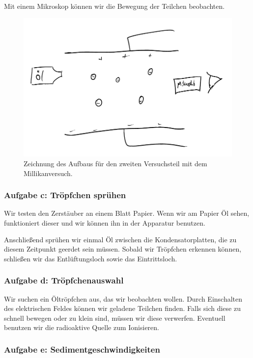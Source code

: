 \documentclass[11pt]{article}
\begin{document}
Mit einem Mikroskop können wir die Bewegung der Teilchen beobachten.

\begin{figure}[h!]
	\centering
	\includegraphics[width=\textwidth]{Aufbau_Millikanversuch.pdf}
	\caption{Zeichnung des Aufbaus für den zweiten Versuchsteil mit dem
	Millikanversuch.}
	\label{fig:Millikanversuch}
\end{figure}

\subsubsection{Aufgabe c: Tröpfchen sprühen}

Wir testen den Zerstäuber an einem Blatt Papier. Wenn wir am Papier Öl sehen,
funktioniert dieser und wir können ihn in der Apparatur benutzen.

Anschließend sprühen wir einmal Öl zwischen die Kondensatorplatten, die zu
diesem Zeitpunkt geerdet sein müssen. Sobald wir Tröpfchen erkennen können,
schließen wir das Entlüftungsloch sowie das Eintrittsloch.

\subsubsection{Aufgabe d: Tröpfchenauswahl}

Wir suchen ein Öltröpfchen aus, das wir beobachten wollen. Durch Einschalten
des elektrischen Feldes können wir geladene Teilchen finden. Falls sich diese
zu schnell bewegen oder zu klein sind, müssen wir diese verwerfen. Eventuell
benutzen wir die radioaktive Quelle zum Ionisieren.

\subsubsection{Aufgabe e: Sedimentgeschwindigkeiten}
\end{document}
